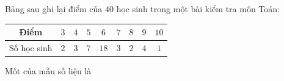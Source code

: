 \begin{ex}
Bảng sau ghi lại điểm của $40$ học sinh trong một bài kiểm tra môn Toán:
\begin{center}
\begin{tabular}{|c|c|c|c|c|c|c|c|c|}\hline
Điểm & $3$ & $4$ & $5$ & $6$ & $7$ & $8$ & $9$ & $10$\\\hline
Số học sinh & $2$ & $3$ & $7$ & $18$ & $3$ & $2$ & $4$ & $1$\\\hline
\end{tabular}
\end{center}
Mốt của mẫu số liệu là
\end{ex}
